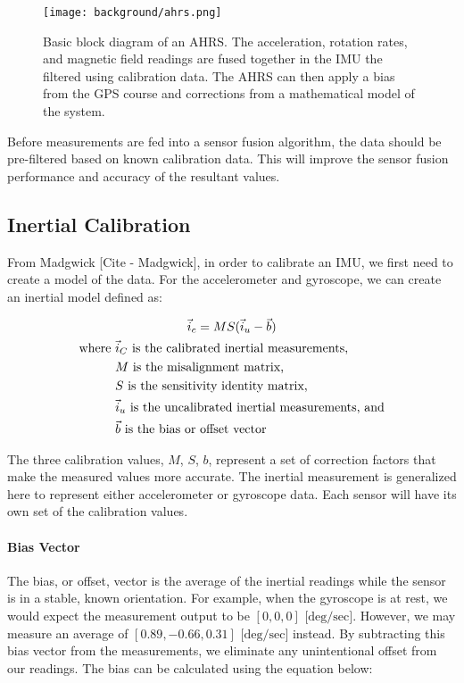 \begin{figure}[h!]
    \caption[AHRS block diagram]{Basic block diagram of an AHRS. 
    The acceleration, rotation rates, and magnetic field readings are fused together in the IMU the filtered using calibration data. 
    The AHRS can then apply a bias from the GPS course and corrections from a mathematical model of the system.}
    \label{fig:ahrs_design}
    \centering
    \texttt{[image: background/ahrs.png]}
\end{figure}

Before measurements are fed into a sensor fusion algorithm, the data should be pre-filtered based on known calibration data.
This will improve the sensor fusion performance and accuracy of the resultant values.

\subsection{Inertial Calibration}

From Madgwick [Cite - Madgwick], in order to calibrate an IMU, we first need to create a model of the data. For the accelerometer and gyroscope, we can create an inertial model defined as:

\begin{gather} \label{eq:inertial_model}
    \vec{i}_c=MS(\vec{i}_u-\vec{b}) \\
    \begin{aligned}
        \text{where } & \vec{i}_C \text{ is the calibrated inertial measurements,} \\ 
        & M \text{ is the misalignment matrix,} \\
        & S \text{ is the sensitivity identity matrix,} \\
        & \vec{i}_u \text{ is the uncalibrated inertial measurements, and} \\
        & \vec{b} \text{ is the bias or offset vector}
    \end{aligned} \notag
\end{gather}

The three calibration values, $M$, $S$, $b$, represent a set of correction factors that make the measured values more accurate. The inertial measurement is generalized here to represent either accelerometer or gyroscope data. Each sensor will have its own set of the calibration values.

\paragraph*{Bias Vector} The bias, or offset, vector is the average of the inertial readings while the sensor is in a stable, known orientation. For example, when the gyroscope is at rest, we would expect the measurement output to be $[0,0,0] \text{ [deg/sec]}$. However, we may measure an average of $[0.89, -0.66, 0.31] \text{ [deg/sec]}$ instead. By subtracting this bias vector from the measurements, we eliminate any unintentional offset from our readings. The bias can be calculated using the equation below:

